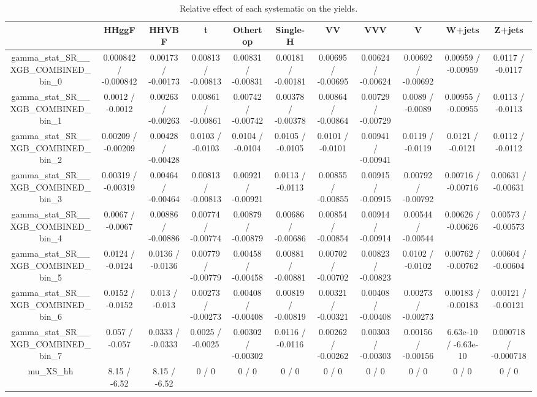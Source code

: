 \documentclass[10pt]{article}
\begin{document}
\begin{table}[htbp]
\begin{center}
\begin{tabular}{|c|c|c|c|c|c|c|c|c|c|c|}
\hline 
      & HHggF      & HHVBF      & t      & Othertop      & Single-H      & VV      & VVV      & V      & W+jets      & Z+jets \\ 
\hline 
  gamma_stat_SR__XGB_COMBINED_bin_0 & 0.000842 / -0.000842 & 0.00173 / -0.00173 & 0.00813 / -0.00813 & 0.00831 / -0.00831 & 0.00181 / -0.00181 & 0.00695 / -0.00695 & 0.00624 / -0.00624 & 0.00692 / -0.00692 & 0.00959 / -0.00959 & 0.0117 / -0.0117 \\ 
  gamma_stat_SR__XGB_COMBINED_bin_1 & 0.0012 / -0.0012 & 0.00263 / -0.00263 & 0.00861 / -0.00861 & 0.00742 / -0.00742 & 0.00378 / -0.00378 & 0.00864 / -0.00864 & 0.00729 / -0.00729 & 0.0089 / -0.0089 & 0.00955 / -0.00955 & 0.0113 / -0.0113 \\ 
  gamma_stat_SR__XGB_COMBINED_bin_2 & 0.00209 / -0.00209 & 0.00428 / -0.00428 & 0.0103 / -0.0103 & 0.0104 / -0.0104 & 0.0105 / -0.0105 & 0.0101 / -0.0101 & 0.00941 / -0.00941 & 0.0119 / -0.0119 & 0.0121 / -0.0121 & 0.0112 / -0.0112 \\ 
  gamma_stat_SR__XGB_COMBINED_bin_3 & 0.00319 / -0.00319 & 0.00464 / -0.00464 & 0.00813 / -0.00813 & 0.00921 / -0.00921 & 0.0113 / -0.0113 & 0.00855 / -0.00855 & 0.00915 / -0.00915 & 0.00792 / -0.00792 & 0.00716 / -0.00716 & 0.00631 / -0.00631 \\ 
  gamma_stat_SR__XGB_COMBINED_bin_4 & 0.0067 / -0.0067 & 0.00886 / -0.00886 & 0.00774 / -0.00774 & 0.00879 / -0.00879 & 0.00686 / -0.00686 & 0.00854 / -0.00854 & 0.00914 / -0.00914 & 0.00544 / -0.00544 & 0.00626 / -0.00626 & 0.00573 / -0.00573 \\ 
  gamma_stat_SR__XGB_COMBINED_bin_5 & 0.0124 / -0.0124 & 0.0136 / -0.0136 & 0.00779 / -0.00779 & 0.00458 / -0.00458 & 0.00881 / -0.00881 & 0.00702 / -0.00702 & 0.00823 / -0.00823 & 0.0102 / -0.0102 & 0.00762 / -0.00762 & 0.00604 / -0.00604 \\ 
  gamma_stat_SR__XGB_COMBINED_bin_6 & 0.0152 / -0.0152 & 0.013 / -0.013 & 0.00273 / -0.00273 & 0.00408 / -0.00408 & 0.00819 / -0.00819 & 0.00321 / -0.00321 & 0.00408 / -0.00408 & 0.00273 / -0.00273 & 0.00183 / -0.00183 & 0.00121 / -0.00121 \\ 
  gamma_stat_SR__XGB_COMBINED_bin_7 & 0.057 / -0.057 & 0.0333 / -0.0333 & 0.0025 / -0.0025 & 0.00302 / -0.00302 & 0.0116 / -0.0116 & 0.00262 / -0.00262 & 0.00303 / -0.00303 & 0.00156 / -0.00156 & 6.63e-10 / -6.63e-10 & 0.000718 / -0.000718 \\ 
  mu_XS_hh & 8.15 / -6.52 & 8.15 / -6.52 & 0 / 0 & 0 / 0 & 0 / 0 & 0 / 0 & 0 / 0 & 0 / 0 & 0 / 0 & 0 / 0 \\ 
\hline 
\end{tabular} 
\caption{Relative effect of each systematic on the yields.} 
\end{center} 
\end{table} 
\end{document}
